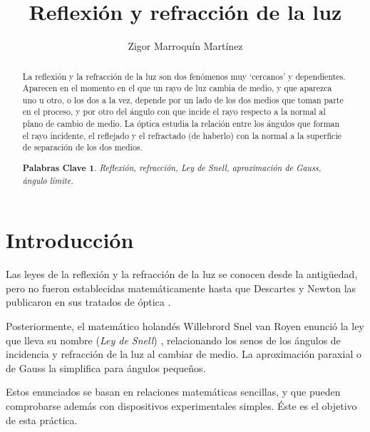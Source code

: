\documentclass[a4paper,twocolumn]{article}
\title{Reflexión y refracción de la luz}
\author{Zigor Marroquín Martínez}
\affil{zmarroqui1@alumno.uned.es}
\date{} %
\newtheorem*{keywords*}{Palabras Clave}
\begin{document}
	
	\maketitle
	
	\begin{abstract}
		
		La reflexión y la refracción de la luz son dos fenómenos muy `cercanos' y dependientes. Aparecen en el momento en el que un rayo de luz cambia de medio, y que aparezca uno u otro, o los dos a la vez, depende por un lado de los dos medios que toman parte en el proceso, y por otro del ángulo con que incide el rayo respecto a la normal al plano de cambio de medio. La óptica estudia la relación entre los ángulos que forman el rayo incidente, el reflejado y el refractado (de haberlo) con la normal a la superficie de separación de los dos medios. %
		
		\begin{keywords*}
			
			Reflexión, refracción, Ley de Snell, aproximación de Gauss, ángulo límite.
			
		\end{keywords*}
		
	\end{abstract}
	
	\section{Introducción}

         
        Las leyes de la reflexión y la refracción de la luz se conocen desde la antigüedad, pero no fueron establecidas matemáticamente hasta que Descartes y Newton las publicaron en sus tratados de óptica \cite{newton1952opticks} \cite{descartes1664monde}.
        
        Posteriormente, el matemático holandés Willebrord Snel van Royen enunció la ley que lleva su nombre (\textit{Ley de Snell}) \cite{huygens1703dioptrica}, relacionando los senos de los ángulos de incidencia y refracción de la luz al cambiar de medio. La aproximación paraxial o de Gauss la simplifica para ángulos pequeños.
        
        Estos enunciados se basan en relaciones matemáticas sencillas, y que pueden comprobarse además con dispositivos experimentales simples. Éste es el objetivo de esta práctica.
\end{document}
